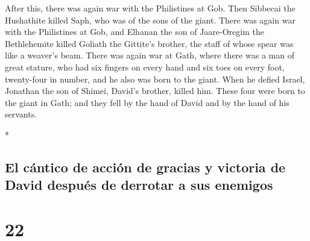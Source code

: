 \begin{paracol}{2}
\begin{otherlanguage}{english}
 After this, there was again war with the Philistines at
Gob. Then Sibbecai the Hushathite killed Saph, who was of the sons of
the giant.  There was again war with the Philistines at
Gob, and Elhanan the son of Jaare-Oregim the Bethlehemite killed Goliath
the Gittite's brother, the staff of whose spear was like a weaver's
beam.  There was again war at Gath, where there was a man
of great stature, who had six fingers on every hand and six toes on
every foot, twenty-four in number, and he also was born to the giant.
 When he defied Israel, Jonathan the son of Shimei,
David's brother, killed him.  These four were born to the
giant in Gath; and they fell by the hand of David and by the hand of his
servants.

\end{otherlanguage}

\switchcolumn[0]*

\hypertarget{el-cuxe1ntico-de-acciuxf3n-de-gracias-y-victoria-de-david-despuuxe9s-de-derrotar-a-sus-enemigos}{%
\subsection{El cántico de acción de gracias y victoria de David después
de derrotar a sus
enemigos}\label{el-cuxe1ntico-de-acciuxf3n-de-gracias-y-victoria-de-david-despuuxe9s-de-derrotar-a-sus-enemigos}}

\hypertarget{section-42}{%
\section{22}\label{section-42}}


\end{paracol}
